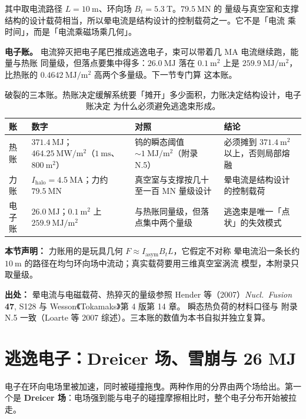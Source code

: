 其中取电流路径 $L=10\ \mathrm{m}$、环向场 $B_t=5.3\ \mathrm{T}$。$79.5\ \mathrm{MN}$ 的
量级与真空室和支撑结构的设计载荷相当，所以晕电流是结构设计的控制载荷之一。它不是「电流
乘时间」，而是「电流乘磁场乘几何」。

\textbf{电子账。} 电流猝灭把电子尾巴推成逃逸电子，束可以带着几 MA 电流继续跑，能量与热账
同量级，但落点要集中得多：$26.0\ \mathrm{MJ}$ 落在 $0.1\ \mathrm{m^2}$ 上是
$259.9\ \mathrm{MJ/m^2}$，比热账的 $0.4642\ \mathrm{MJ/m^2}$ 高两个多量级。下一节专门算
这本账。

\begin{table}[htbp]
\centering
\small
\caption{破裂的三本账。热账决定缓解系统要「摊开」多少面积，力账决定结构设计，电子账决定
为什么必须避免逃逸束形成。}
\label{tab:app-v-accounts}
\begin{tabular}{@{}p{1.9cm}p{3.4cm}p{3.4cm}p{3.4cm}@{}}
\toprule
账 & 数字 & 对照 & 结论 \\
\midrule
热账 & $371.4\ \mathrm{MJ}$；$464.25\ \mathrm{MW/m^2}$（$1\ \mathrm{ms}$、$800\ \mathrm{m^2}$） & 钨的瞬态阈值 $\sim1\ \mathrm{MJ/m^2}$（附录 N.5） & 必须摊到 $371.4\ \mathrm{m^2}$ 以上，否则局部熔融 \\
力账 & $I_{\mathrm{halo}}=4.5\ \mathrm{MA}$；力约 $79.5\ \mathrm{MN}$ & 真空室与支撑按几十至一百 MN 量级设计 & 晕电流是结构设计的控制载荷 \\
电子账 & $26.0\ \mathrm{MJ}$；$0.1\ \mathrm{m^2}$ 上 $259.9\ \mathrm{MJ/m^2}$ & 与热账同量级，但落点集中两个量级 & 逃逸束是唯一「点状」的失效模式 \\
\bottomrule
\end{tabular}

\end{table}

\textbf{本节声明：} 力账用的是玩具几何 $F\approx I_{\mathrm{asym}}B_tL$，它假定不对称
晕电流沿一条长约 $10\ \mathrm{m}$ 的路径在均匀环向场中流动；真实载荷要用三维真空室涡流
模型，本附录只取量级。

{\footnotesize
\textbf{出处：} 晕电流与电磁载荷、热猝灭的量级参照 Hender 等（2007）\textit{Nucl.\
Fusion} \textbf{47}, S128 与 Wesson《Tokamaks》第 4 版第 14 章。
瞬态热负荷的材料口径与
附录 N.5 一致（Loarte 等 2007 综述）。三本账的数值为本书自拟并独立复算。
}

\section{逃逸电子：Dreicer 场、雪崩与 26 MJ}
\label{sec:app-v-runaway}

电子在环向电场里被加速，同时被碰撞拖曳。两种作用的分界由两个场给出。第一个是
\textbf{\mbox{Dreicer} 场}：电场强到能与电子的碰撞摩擦相比时，整个电子分布开始被拉走。

